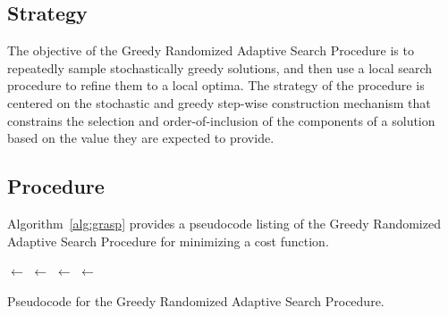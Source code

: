 \subsection{Strategy}
The objective of the Greedy Randomized Adaptive Search Procedure is to repeatedly sample stochastically greedy solutions, and then use a local search procedure to refine them to a local optima.
The strategy of the procedure is centered on the stochastic and greedy step-wise construction mechanism that constrains the selection and order-of-inclusion of the components of a solution based on the value they are expected to provide.

\subsection{Procedure}
Algorithm~\ref{alg:grasp} provides a pseudocode listing of the Greedy Randomized Adaptive Search Procedure for minimizing a cost function.

\begin{algorithm}[htp]
	\SetLine
	\KwIn{\Alpha}
	\KwOut{\Best}
	\Best $\leftarrow$ \ConstructRandomSolution{}\;
	\While{$\neg$ \StopCondition{}} {
		\Candidate $\leftarrow$ \GreedyRandomizedConstruction{\Alpha}\;
		\Candidate $\leftarrow$ \LocalSearch{\Candidate}\;
		\If{\Cost{\Candidate} $<$ \Cost{\Best}} {
			\Best $\leftarrow$ \Candidate\;
		}
	}
	\Return{\Best}\;
	\caption{Pseudocode for the Greedy Randomized Adaptive Search Procedure.}
	\label{alg:grasp}
\end{algorithm}

